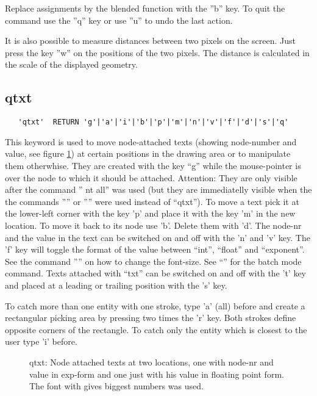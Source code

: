 \documentclass{article}
\begin{document}
Replace assignments by the blended function with the ''b'' key. To quit the command use the ''q'' key or use ''u'' to undo the last action. 

It is also possible to measure distances between two pixels on the screen. Just press the key ''w'' on the positions of the two pixels. The distance is calculated in the scale of the displayed geometry. 

\subsection{\label{qtxt}qtxt}
\begin{verbatim}
   'qtxt'  RETURN 'g'|'a'|'i'|'b'|'p'|'m'|'n'|'v'|'f'|'d'|'s'|'q' 
\end{verbatim}
This keyword is used to move node-attached texts (showing node-number and value, see figure \ref{qtxtp}) at certain positions in the drawing area or to manipulate them otherwhise. They are created with the key ``g'' while the mouse-pointer is over the node to which it should be attached. Attention: They are only visible after the command '' nt all'' was used (but they are immediatelly visible when the the commands '''' or '''' were used instead of ``qtxt''). To move a text pick it at the lower-left corner with the key 'p' and place it with the key 'm' in the new location. To move it back to its node use 'b'. Delete them with 'd'. The node-nr and the value in the text can be switched on and off with the 'n' and 'v' key. The 'f' key will toggle the format of the value between ``int'', ``float'' and ``exponent''. See the command '''' on how to change the font-size. See ``'' for the batch mode command. Texts attached with ``txt'' can be switched on and off with the 't' key and placed at a leading or trailing position with the 's' key.

To catch more than one entity with one stroke, type 'a' (all) before and create a rectangular picking area by pressing two times the 'r' key. Both strokes define opposite corners of the rectangle. To catch only the entity which is closest to the user type 'i' before.
  
\begin{figure}[h]
\caption{\label{qtxtp}qtxt: Node attached texts at two locations, one with node-nr and value in exp-form and one just with his value in floating point form. The font with gives biggest numbers was used.}
\end{figure}
\end{document}
